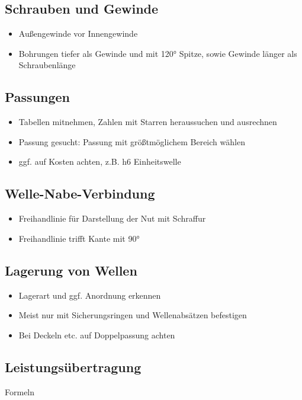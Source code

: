 \documentclass[a4paper,parskip=half*,DIV=7,fontsize=11pt]{scrartcl}
\begin{document}
\subsection{Schrauben und Gewinde}
\begin{itemize}
	\item Außengewinde vor Innengewinde
	\item Bohrungen tiefer als Gewinde und mit 120° Spitze, sowie Gewinde länger als Schraubenlänge
\end{itemize}

\subsection{Passungen}
\begin{itemize}
	\item Tabellen mitnehmen, Zahlen mit Starren heraussuchen und ausrechnen
	\item Passung gesucht: Passung mit größtmöglichem Bereich wählen
	\item ggf. auf Kosten achten, z.B. h6 Einheitswelle
\end{itemize}

\subsection{Welle-Nabe-Verbindung}
\begin{itemize}
	\item Freihandlinie für Darstellung der Nut mit Schraffur
	\item Freihandlinie trifft Kante mit 90°
\end{itemize}

\subsection{Lagerung von Wellen}
\begin{itemize}
	\item Lagerart und ggf. Anordnung erkennen
	\item Meist nur mit Sicherungsringen und Wellenabsätzen befestigen
	\item Bei Deckeln etc. auf Doppelpassung achten
\end{itemize}

\subsection{Leistungsübertragung}
	Formeln %
	
\end{document}
